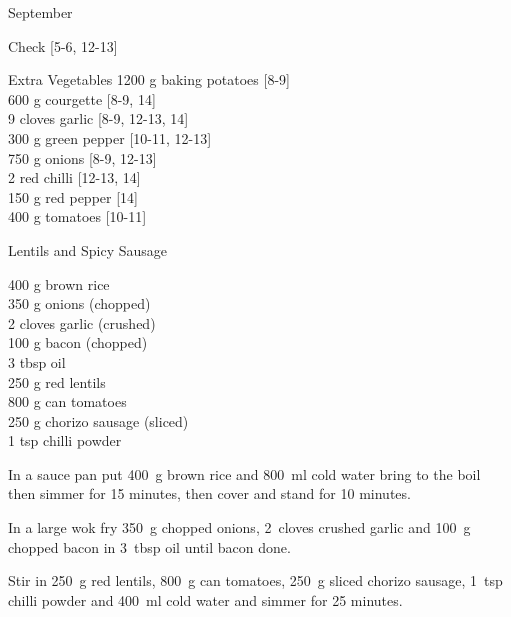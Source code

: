 \begin{menu}{September}
\begin{shoppinglist}{Check}
        {\scriptsize[5-6, 12-13]}\\
      \end{shoppinglist}%
      \begin{shoppinglist}{Extra Vegetables}
      1200 g baking potatoes 
        {\scriptsize[8-9]}\\
      600 g courgette 
        {\scriptsize[8-9, 14]}\\
      9 cloves garlic 
        {\scriptsize[8-9, 12-13, 14]}\\
      300 g green pepper 
        {\scriptsize[10-11, 12-13]}\\
      750 g onions 
        {\scriptsize[8-9, 12-13]}\\
      2  red chilli 
        {\scriptsize[12-13, 14]}\\
      150 g red pepper 
        {\scriptsize[14]}\\
      400 g tomatoes 
        {\scriptsize[10-11]}\\
      \end{shoppinglist}%
      \par\vfil %
    \vfil\clearpage
  
    \begin{recipe}{2}{Lentils and Spicy Sausage}%
		\begin{ingredients}
		400 g brown rice  \\
	350 g onions (chopped) \\
	2 cloves garlic (crushed) \\
	100 g bacon (chopped) \\
	3 tbsp oil  \\
	250 g red lentils  \\
	800 g can tomatoes  \\
	250 g chorizo sausage (sliced) \\
	1 tsp chilli powder  \\
	
		\end{ingredients}
	
    \begin{instructions}
    \item 
      In a
      sauce pan
      put
      400~g  brown rice
      and
      800~ml  cold water
      bring to the boil then simmer for 15 minutes,
      then cover and stand for 10 minutes.
    \item 
        In a large wok fry
        350~g chopped onions,
        2~cloves crushed garlic
        and
        100~g chopped bacon
        in
        3~tbsp  oil
        until bacon done.
      \item 
        Stir in
        250~g  red lentils,
        800~g  can tomatoes,
        250~g sliced chorizo sausage,
        1~tsp  chilli powder
        and
        400~ml  cold water
        and simmer for 25 minutes.
      

\end{instructions}
\end{recipe}
\end{menu}
